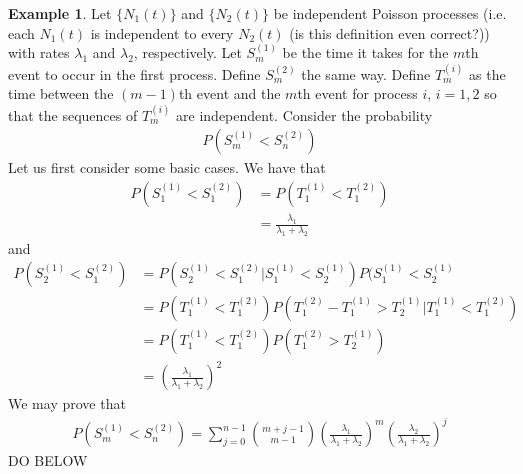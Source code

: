 \documentclass[11pt]{amsart}
\theoremstyle{definition}
\newtheorem{example}[theorem]{Example}
\numberwithin{equation}{section}
\begin{document}
 \begin{example}
     Let $\{N_1(t)\}$ and $\{N_2(t)\}$ be independent Poisson processes (i.e. each $N_1(t)$ is independent to every $N_2(t)$ (is this definition even correct?)) with rates $\lambda_1$ and $\lambda_2$, respectively. Let $S_m^{(1)}$ be the time it takes for the $m$th event to occur in the first process. Define $S_m^{(2)}$ the same way. Define $T_m^{(i)}$ as the time between the $(m-1)$th event and the $m$th event for process $i,\,i=1,2$ so that the sequences of $T_m^{(i)}$ are independent. Consider the probability
     \begin{align*}
         P(S_m^{(1)}<S_n^{(2)})
     \end{align*}
     Let us first consider some basic cases. We have that
     \begin{align*}
         P(S_1^{(1)}<S_1^{(2)})&=P(T_1^{(1)}<T_1^{(2)})\\
         &=\frac{\lambda_1}{\lambda_1+\lambda_2}
     \end{align*}
     and
     \begin{align*}
         P(S_2^{(1)}<S_1^{(2)})&=P(S_2^{(1)}<S_1^{(2)}|S_1^{(1)}<S_2^{(1)})P(S_1^{(1)}<S_2^{(1)}\\
         &=P(T_1^{(1)}<T_1^{(2)})P(T_1^{(2)}-T_1^{(1)}>T_2^{(1)}|T_1^{(1)}<T_1^{(2)})\\
         &=P(T_1^{(1)}<T_1^{(2)})P(T_1^{(2)}>T_2^{(1)})\\
         &=\left(\frac{\lambda_1}{\lambda_1+\lambda_2}\right)^2
     \end{align*}
     We may prove that
     \begin{align*}
         P(S_m^{(1)}<S_n^{(2)})=\sum_{j=0}^{n-1}\binom{m+j-1}{m-1}\left(\frac{\lambda_1}{\lambda_1+\lambda_2}\right)^m\left(\frac{\lambda_2}{\lambda_1+\lambda_2}\right)^j
     \end{align*}
     DO BELOW
 \end{example}
\end{document}
